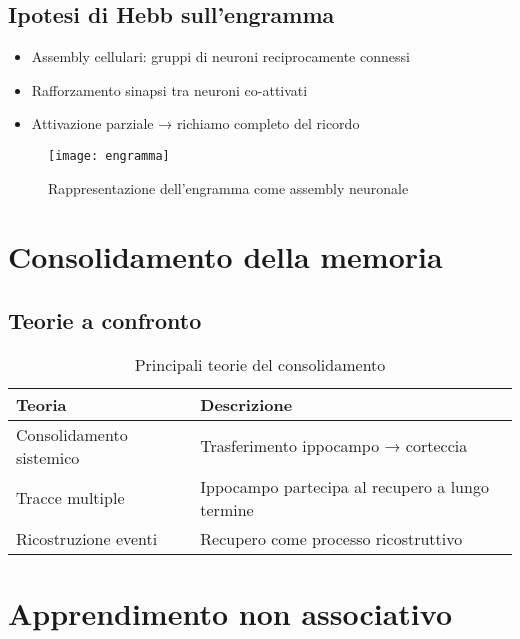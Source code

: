 \documentclass[11pt]{article}
\begin{document}
\subsection*{Ipotesi di Hebb sull'engramma}
\begin{itemize}
    \item Assembly cellulari: gruppi di neuroni reciprocamente connessi
    \item Rafforzamento sinapsi tra neuroni co-attivati
    \item Attivazione parziale → richiamo completo del ricordo
\end{itemize}

\begin{figure}[h]
    \centering
    \texttt{[image: engramma]} %
    \caption{Rappresentazione dell'engramma come assembly neuronale}
    \label{fig:engramma}
\end{figure}

\section*{Consolidamento della memoria}

\subsection*{Teorie a confronto}
\begin{table}[h]
\centering
\caption{Principali teorie del consolidamento}
\begin{tabular}{p{5cm}p{10cm}}
\toprule
\textbf{Teoria} & \textbf{Descrizione} \\
\midrule
Consolidamento sistemico & Trasferimento ippocampo → corteccia \\
Tracce multiple & Ippocampo partecipa al recupero a lungo termine \\
Ricostruzione eventi & Recupero come processo ricostruttivo \\
\bottomrule
\end{tabular}
\end{table}

\section*{Apprendimento non associativo}
\end{document}
